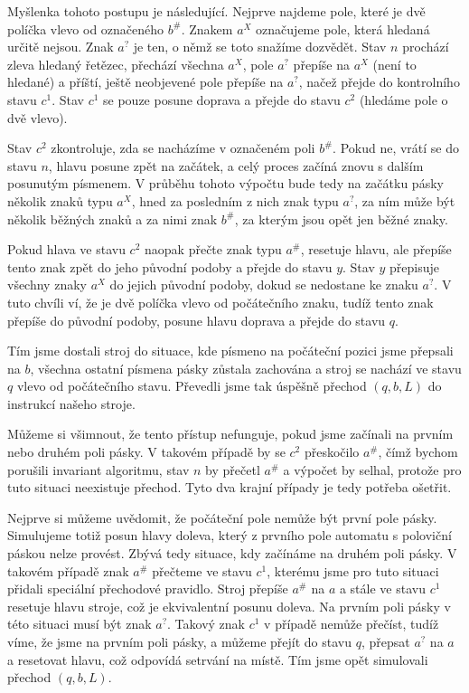 \documentclass{scrartcl}
\begin{document}
    Myšlenka tohoto postupu je následující. Nejprve najdeme pole, které je dvě políčka vlevo od označeného $b^{\#}$. Znakem $a^X$ označujeme pole, která hledaná určitě nejsou. Znak $a^?$ je ten, o němž se toto snažíme dozvědět. Stav $n$ prochází zleva hledaný řetězec, přechází všechna $a^X$, pole $a^?$ přepíše na $a^X$ (není to hledané) a příští, ještě neobjevené pole přepíše na $a^?$, načež přejde do kontrolního stavu $c^1$. Stav $c^1$ se pouze posune doprava a přejde do stavu $c^2$ (hledáme pole o dvě vlevo).

    Stav $c^2$ zkontroluje, zda se nacházíme v označeném poli $b^{\#}$. Pokud ne, vrátí se do stavu $n$, hlavu posune zpět na začátek, a celý proces začíná znovu s dalším posunutým písmenem. V průběhu tohoto výpočtu bude tedy na začátku pásky několik znaků typu $a^X$, hned za posledním z nich znak typu $a^?$, za ním může být několik běžných znaků a za nimi znak $b^{\#}$, za kterým jsou opět jen běžné znaky.

    Pokud hlava ve stavu $c^2$ naopak přečte znak typu $a^{\#}$, resetuje hlavu, ale přepíše tento znak zpět do jeho původní podoby a přejde do  stavu $y$. Stav $y$ přepisuje všechny znaky $a^X$ do jejich původní podoby, dokud se nedostane ke znaku $a^?$. V tuto chvíli ví, že je dvě políčka vlevo od počátečního znaku, tudíž tento znak přepíše do původní podoby, posune hlavu doprava a přejde do  stavu $q$. 
    
    Tím jsme dostali stroj do situace, kde písmeno na počáteční pozici jsme přepsali na $b$, všechna ostatní písmena pásky zůstala zachována a stroj se nachází ve stavu $q$ vlevo od počátečního stavu. Převedli jsme tak úspěšně přechod $(q,b,L)$ do instrukcí našeho stroje.

    Můžeme si všimnout, že tento přístup nefunguje, pokud jsme začínali na prvním nebo druhém poli pásky. V takovém případě by se $c^2$ přeskočilo $a^{\#}$, čímž bychom porušili invariant algoritmu, stav $n$ by přečetl $a^{\#}$ a výpočet by selhal, protože pro tuto situaci neexistuje přechod. Tyto dva krajní případy je tedy potřeba ošetřit. 

    Nejprve si můžeme uvědomit, že počáteční pole nemůže být první pole pásky. Simulujeme totiž posun hlavy doleva, který z prvního pole automatu s poloviční páskou nelze provést. Zbývá tedy situace, kdy začínáme na druhém poli pásky. V takovém případě znak $a^{\#}$ přečteme ve stavu $c^1$, kterému jsme pro tuto situaci přidali speciální přechodové pravidlo. Stroj přepíše $a^{\#}$ na $a$ a stále ve stavu $c^1$ resetuje hlavu stroje, což je ekvivalentní posunu doleva. Na prvním poli pásky v této situaci musí být znak $a^?$. Takový znak $c^1$ v  případě nemůže přečíst, tudíž víme, že jsme na prvním poli pásky, a můžeme přejít do stavu $q$, přepsat $a^?$ na $a$ a resetovat hlavu, což odpovídá setrvání na místě. Tím jsme opět simulovali přechod $(q,b,L)$.
\end{document}
